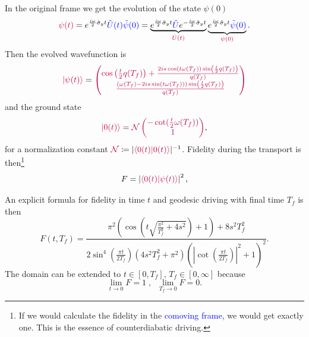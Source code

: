In the original frame we get the evolution of the state $\psi(0)$
\begin{equation}
    \textcolor{purple}{\psi(t)}=e^{\frac{i \omega}{2}\hat\sigma_y t} \textcolor{blue}{\hat U(t) \tilde\psi(0)} = \underbrace{e^{\frac{i \omega}{2}\hat\sigma_y t} \textcolor{blue}{\hat U}e^{-\frac{i \omega}{2}\hat\sigma_y t}}_{\textcolor{purple}{\hat U(t)}} \underbrace{e^{\frac{i \omega}{2}\hat\sigma_y t} \textcolor{blue}{\tilde\psi(0)}}_{\textcolor{purple}{\psi(0)}}.
\end{equation}
Then the evolved wavefunction is
\begin{equation}
    \textcolor{purple}{\ket{\psi(t)}}=\textcolor{purple}{\begin{pmatrix}
        \cos \left(\frac{t}{2} q(T_f)\right)+\frac{2 i s \cos (t \omega(T_f) ) \sin \left(\frac{t}{2} q(T_f)\right)}{q(T_f)}\\
        \frac{(\omega(T_f) -2 i s \sin (t \omega(T_f) )) \sin \left(\frac{t}{2} q(T_f)\right)}{q(T_f)}
    \end{pmatrix}}
\end{equation}
and the ground state
\begin{equation}
    \textcolor{purple}{\ket{0(t)}}=\textcolor{purple}{\mathcal{N}\begin{pmatrix}
        -\cot (\frac{t}{2}\omega(T_f))\\
        1
    \end{pmatrix}},
\end{equation}
for a normalization constant $\textcolor{purple}{\mathcal{N}}\coloneqq |\textcolor{purple}{\braket{0(t)|0(t)}}|^{-1}$.
Fidelity during the transport is then\footnote{If we would calculate the fidelity in the \textcolor{blue}{comoving frame}, we would get exactly one. This is the essence of counterdiabatic driving.}
\begin{equation}
    F=\left|\textcolor{purple}{\braket{0(t)|\psi(t)}}\right|^2,
    \label{fid:definition}
\end{equation}

 An explicit formula for fidelity in time $t$ and geodesic driving with final time $T_f$ is then
\begin{equation}
    F(t,T_f)=\frac{\pi ^2 \left(\cos \left(t \sqrt{\frac{\pi ^2}{T_f^2}+4 s^2}\right)+1\right)+8 s^2 T_f^2}{2 \sin ^4\left(\frac{\pi  t}{2 T_f}\right) \left(4 s^2 T_f^2+\pi ^2\right) \left(\left| \cot \left(\frac{\pi  t}{2 T_f}\right)\right|^2+1\right)^2}.
    \label{eq:fidelitySimplified}
\end{equation}
The domain can be extended to $t\in[0,T_f]$, $T_f\in[0,\infty]$ because 
$$
    \lim_{t\rightarrow 0}F=1\; ,\;\; \lim_{T_f\rightarrow 0}F=0.
$$

